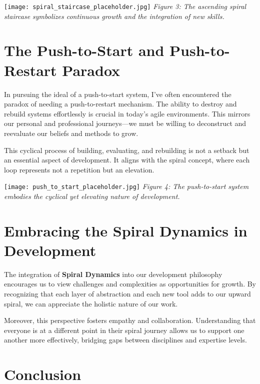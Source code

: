 \documentclass{article}
\begin{document}
\vspace{0.5cm}
\noindent\texttt{[image: spiral\_staircase\_placeholder.jpg]}
\newline
\textit{Figure 3: The ascending spiral staircase symbolizes continuous growth and the integration of new skills.}
\vspace{0.5cm}

\section{The Push-to-Start and Push-to-Restart Paradox}

In pursuing the ideal of a push-to-start system, I've often encountered the paradox of needing a push-to-restart mechanism. The ability to destroy and rebuild systems effortlessly is crucial in today's agile environments. This mirrors our personal and professional journeys—we must be willing to deconstruct and reevaluate our beliefs and methods to grow.

This cyclical process of building, evaluating, and rebuilding is not a setback but an essential aspect of development. It aligns with the spiral concept, where each loop represents not a repetition but an elevation.

\vspace{0.5cm}
\noindent\texttt{[image: push\_to\_start\_placeholder.jpg]}
\newline
\textit{Figure 4: The push-to-start system embodies the cyclical yet elevating nature of development.}
\vspace{0.5cm}

\section{Embracing the Spiral Dynamics in Development}

The integration of \textbf{Spiral Dynamics} into our development philosophy encourages us to view challenges and complexities as opportunities for growth. By recognizing that each layer of abstraction and each new tool adds to our upward spiral, we can appreciate the holistic nature of our work.

Moreover, this perspective fosters empathy and collaboration. Understanding that everyone is at a different point in their spiral journey allows us to support one another more effectively, bridging gaps between disciplines and expertise levels.

\section{Conclusion}
\end{document}
